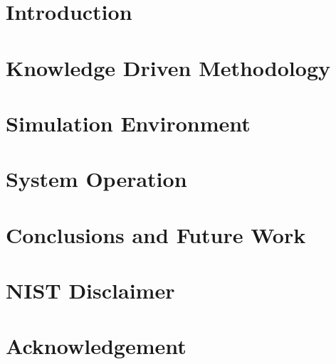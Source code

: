 \documentclass{llncs}
\begin{document}
%
%

\section{Introduction}

\section{Knowledge Driven Methodology}\label{section:architecture}


\section{Simulation Environment}\label{section:simulation}


%
\section{System Operation}\label{section:sensor}


\section{Conclusions and Future Work}\label{section:conclusions}


\section{NIST Disclaimer}


\section{Acknowledgement}

%
%


\clearpage
{} %
\renewcommand{\indexname}{Author Index}
\printindex
\clearpage
{} %
\renewcommand{\indexname}{Subject Index}
%
\end{document}
